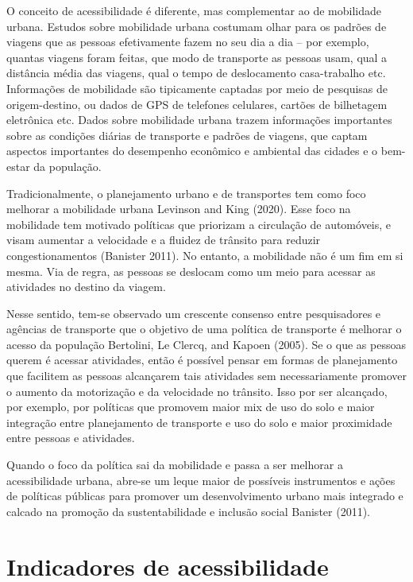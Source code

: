 \documentclass[
  letterpaper,
  DIV=11,
  numbers=noendperiod]{scrreprt}
\begin{document}
O conceito de acessibilidade é diferente, mas complementar ao de
mobilidade urbana. Estudos sobre mobilidade urbana costumam olhar para
os padrões de viagens que as pessoas efetivamente fazem no seu dia a dia
-- por exemplo, quantas viagens foram feitas, que modo de transporte as
pessoas usam, qual a distância média das viagens, qual o tempo de
deslocamento casa-trabalho etc. Informações de mobilidade são
tipicamente captadas por meio de pesquisas de origem-destino, ou dados
de GPS de telefones celulares, cartões de bilhetagem eletrônica etc.
Dados sobre mobilidade urbana trazem informações importantes sobre as
condições diárias de transporte e padrões de viagens, que captam
aspectos importantes do desempenho econômico e ambiental das cidades e o
bem-estar da população.

Tradicionalmente, o planejamento urbano e de transportes tem como foco
melhorar a mobilidade urbana Levinson and King (2020). Esse foco na
mobilidade tem motivado políticas que priorizam a circulação de
automóveis, e visam aumentar a velocidade e a fluidez de trânsito para
reduzir congestionamentos (Banister 2011). No entanto, a mobilidade não
é um fim em si mesma. Via de regra, as pessoas se deslocam como um meio
para acessar as atividades no destino da viagem.

Nesse sentido, tem-se observado um crescente consenso entre
pesquisadores e agências de transporte que o objetivo de uma política de
transporte é melhorar o acesso da população Bertolini, Le Clercq, and
Kapoen (2005). Se o que as pessoas querem é acessar atividades, então é
possível pensar em formas de planejamento que facilitem as pessoas
alcançarem tais atividades sem necessariamente promover o aumento da
motorização e da velocidade no trânsito. Isso por ser alcançado, por
exemplo, por políticas que promovem maior mix de uso do solo e maior
integração entre planejamento de transporte e uso do solo e maior
proximidade entre pessoas e atividades.

Quando o foco da política sai da mobilidade e passa a ser melhorar a
acessibilidade urbana, abre-se um leque maior de possíveis instrumentos
e ações de políticas públicas para promover um desenvolvimento urbano
mais integrado e calcado na promoção da sustentabilidade e inclusão
social Banister (2011).

\hypertarget{indicadores-de-acessibilidade}{%
\chapter{Indicadores de
acessibilidade}\label{indicadores-de-acessibilidade}}
\end{document}
